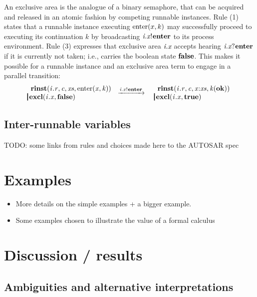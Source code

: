 \documentclass[twocolumn]{article}
\begin{document}
An exclusive area is the analogue of a binary semaphore, that can be acquired and released in an atomic fashion by competing runnable instances. Rule (1) states that a runnable instance executing $\Enter x k$ may successfully proceed to executing its continuation $k$ by broadcasting $\say{\Tx x i}{\Tenter}$ to its process environment. Rule (3) expresses that exclusive area $\Tx x i$ accepts hearing $\hear{\Tx x i}{\Tenter}$ if it is currently not taken; i.e., carries the boolean state $\Tfalse$. This makes it possible for a runnable instance and an exclusive area term to engage in a parallel transition:
\begin{eqnarray}
	\Tstep{\TparLong{\Trinst{\Tr{\Tvar{R}}{\Tvar{I}}}{\Tvar{C}}{\Tvar{Xs}}{\TrteEnter{\Tvar{X}}{\Tvar{K}}}}
				{\Texcl{\Tx{\Tvar{X}}{\Tvar{I}}}{\Tfalse}}}
	  	  {\say{\Tx x i}{\Tenter}}
		  {\TparLong{\Trinst{\Tr{\Tvar{R}}{\Tvar{I}}}{\Tvar{C}}{\Tcons{\Tvar{X}}{\Tvar{Xs}}}{\Tap{\Tvar{K}}{\Tok}}}
		  {\Texcl{\Tx{\Tvar{X}}{\Tvar{I}}}{\Ttrue}}}
\end{eqnarray}


\subsection{Inter-runnable variables}



TODO: some links from rules and choices made here to the AUTOSAR spec

\section{Examples}
\label{sec:Examples}

\begin{itemize}
\item More details on the simple examples + a bigger example.
\item Some examples chosen to illustrate the value of a formal calculus
\end{itemize}

\section{Discussion / results}
\label{sec:Disc}

\subsection{Ambiguities and alternative interpretations}
\label{sec:DiscAmb}
\end{document}
